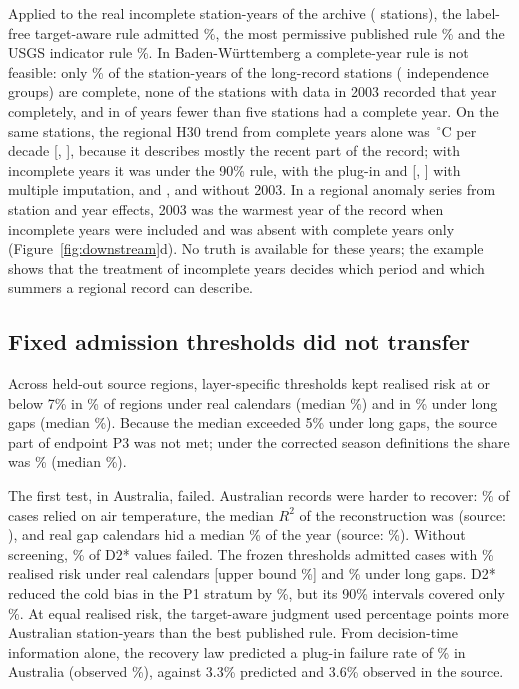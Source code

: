 \documentclass[draft]{agujournal2025}
\begin{document}
Applied to the \TRealYears{} real incomplete station-years of the archive (\TRealStations{} stations), the label-free target-aware rule admitted \TRealAdmitted\%, the most permissive published rule \TRealBestRule\% and the USGS indicator rule \TRealUSGSRule\%. In Baden-W\"urttemberg a complete-year rule is not feasible: only \TBwCompleteShare\% of the station-years of the \TBwStations{} long-record stations (\TBwGroups{} independence groups) are complete, none of the \TBwIncompleteTwoThousandThree{} stations with data in 2003 recorded that year completely, and in \TBwYearsFewComplete{} of \TBwYears{} years fewer than five stations had a complete year. On the same stations, the regional H30 trend from complete years alone was \TBwAZero\,$^{\circ}$C per decade [\TBwAZeroLow, \TBwAZeroHigh], because it describes mostly the recent part of the record; with incomplete years it was \TBwAOne{} under the 90\% rule, \TBwB{} with the plug-in and \TBwC{} [\TBwCLow, \TBwCHigh] with multiple imputation, and \TBwAOneNoTwoThousandThree, \TBwBNoTwoThousandThree{} and \TBwCNoTwoThousandThree{} without 2003. In a regional anomaly series from station and year effects, 2003 was the warmest year of the record when incomplete years were included and was absent with complete years only (Figure~\ref{fig:downstream}d). No truth is available for these years; the example shows that the treatment of incomplete years decides which period and which summers a regional record can describe.

\subsection{Fixed admission thresholds did not transfer}
Across \TLoroRegions{} held-out source regions, layer-specific thresholds kept realised risk at or below 7\% in \TLoroShareDeploy\% of regions under real calendars (median \TLoroMedianDeploy\%) and in \TLoroShareMech\% under long gaps (median \TLoroMedianMech\%). Because the median exceeded 5\% under long gaps, the source part of endpoint P3 was not met; under the corrected season definitions the share was \TLoroShareMechRtwo\% (median \TLoroMedianMechRtwo\%).

The first test, in Australia, failed. Australian records were harder to recover: \TAuAirShare\% of cases relied on air temperature, the median $R^2$ of the reconstruction was \TAuRTwo{} (source: \TSourceRTwo), and real gap calendars hid a median \TAuMissing\% of the year (source: \TSourceMissing\%). Without screening, \TAuUnscreenedDTwo\% of D2* values failed. The frozen thresholds admitted cases with \TAuRiskDeploy\% realised risk under real calendars [upper bound \TAuRiskDeployHigh\%] and \TAuRiskMech\% under long gaps. D2* reduced the cold bias in the P1 stratum by \TAuPOneReduction\%, but its 90\% intervals covered only \TAuPOneCoverage\%. At equal realised risk, the target-aware judgment used \TAuGain{} percentage points more Australian station-years than the best published rule. From decision-time information alone, the recovery law predicted a plug-in failure rate of \TAuLawPredicted\% in Australia (observed \TAuObservedFail\%), against 3.3\% predicted and 3.6\% observed in the source.
\end{document}
